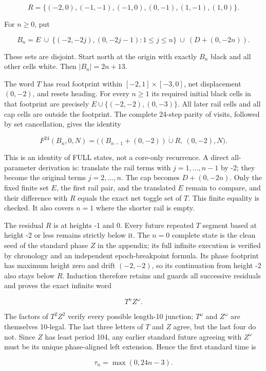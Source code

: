 \documentclass[
  11pt,
]{article}
\begin{document}
\[R=\{(-2,0),(-1,-1),(-1,0),(0,-1),(1,-1),(1,0)\}.\]

For \(n\ge0\), put

\[B_n=E\ \cup\ \{(-2,-2j),(0,-2j-1):1\le j\le n\}\ \cup\ (D+(0,-2n)).\]

These sets are disjoint. Start north at the origin with exactly \(B_n\)
black and all other cells white. Then \(|B_n|=2n+13\).

The word \(T\) has read footprint within \([-2,1]\times[-3,0]\), net
displacement \((0,-2)\), and resets heading. For every \(n\ge1\) its
required initial black cells in that footprint are precisely
\(E\cup\{(-2,-2),(0,-3)\}\). All later rail cells and all cap cells are
outside the footprint. The complete 24-step parity of visits, followed
by set cancellation, gives the identity

\[F^{24}(B_n,0,N)=\big((B_{n-1}+(0,-2))\mathbin{\dot\cup}R,\ (0,-2),N\big).\]

This is an identity of FULL states, not a core-only recurrence. A direct
all-parameter derivation is: translate the rail terms with
\(j=1,\ldots,n-1\) by -2; they become the original terms
\(j=2,\ldots,n\). The cap becomes \(D+(0,-2n)\). Only the fixed finite
set \(E\), the first rail pair, and the translated \(E\) remain to
compare, and their difference with \(R\) equals the exact net toggle set
of \(T\). This finite equality is checked. It also covers \(n=1\) where
the shorter rail is empty.

The residual \(R\) is at heights -1 and 0. Every future repeated \(T\)
segment based at height -2 or less remains strictly below it. The
\(n=0\) complete state is the clean seed of the standard phase \(Z\) in
the appendix; its full infinite execution is verified by chronology and
an independent epoch-breakpoint formula. Its phase footprint has maximum
height zero and drift \((-2,-2)\), so its continuation from height -2
also stays below \(R\). Induction therefore retains and guards all
successive residuals and proves the exact infinite word

\[T^n Z^\omega.\]

The factors of \(T^2Z^2\) verify every possible length-10 junction;
\(T^\omega\) and \(Z^\omega\) are themselves 10-legal. The last three
letters of \(T\) and \(Z\) agree, but the last four do not. Since \(Z\)
has least period 104, any earlier standard future agreeing with
\(Z^\omega\) must be its unique phase-aligned left extension. Hence the
first standard time is

\[\tau_n=\max(0,24n-3).\]
\end{document}
